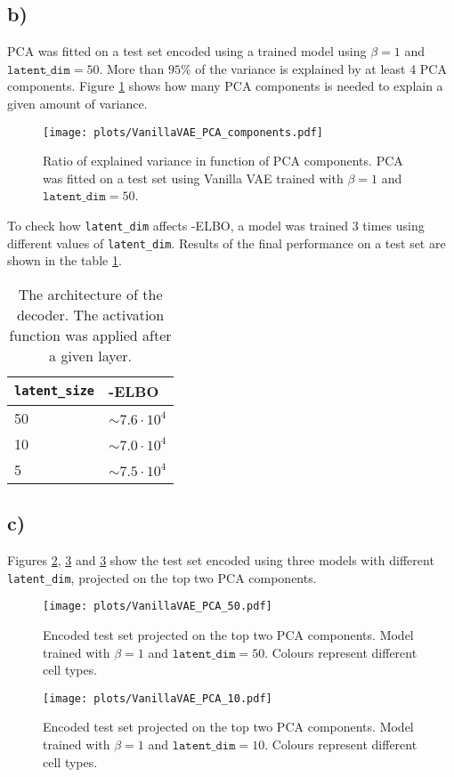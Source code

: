 \documentclass[a4paper,11pt]{article}
\begin{document}
\subsection*{b)}
PCA was fitted on a test set encoded using a trained model using $\beta=1$ and $\texttt{latent\_dim}=50$.
More than $95\%$ of the variance is explained by at least 4 PCA components. Figure \ref{PCA1} shows how many PCA components is needed to explain a given amount of variance.
\begin{figure}[H]
    \centering
    \texttt{[image: plots/VanillaVAE\_PCA\_components.pdf]}
    \caption{Ratio of explained variance in function of PCA components. PCA was fitted on a test set using Vanilla VAE trained with $\beta = 1$ and $\texttt{latent\_dim}=50$.}
    \label{PCA1}
\end{figure}
\noindent To check how \texttt{latent\_dim} affects -ELBO, a model was trained 3 times using different values of \texttt{latent\_dim}. Results of the final performance on a test set are shown in the table \ref{PCATab}.
\begin{table}[H]
\centering
\begin{tabular}{|l|l|}
\hline
 \textbf{\texttt{latent\_size}} & \textbf{-ELBO} \\ \hline
 50 & $\sim7.6\cdot10^{4}$  \\ \hline
 10 & $\sim7.0\cdot10^{4}$  \\ \hline
 5 & $\sim7.5\cdot10^{4}$  \\ \hline
\end{tabular}
\label{PCATab}
\caption{The architecture of the decoder. The activation function was applied after a given layer.}
\end{table}

\subsection*{c)}
Figures \ref{PCA2}, \ref{PCA3} and \ref{PCA3} show the test set encoded using three models with different \texttt{latent\_dim}, projected on the top two PCA components.
\begin{figure}[H]
    \centering
    \texttt{[image: plots/VanillaVAE\_PCA\_50.pdf]}
    \caption{Encoded test set projected on the top two PCA components. Model trained with $\beta=1$ and $\texttt{latent\_dim}=50$. Colours represent different cell types.}
    \label{PCA2}
\end{figure}

\begin{figure}[H]
    \centering
    \texttt{[image: plots/VanillaVAE\_PCA\_10.pdf]}
    \caption{Encoded test set projected on the top two PCA components. Model trained with $\beta=1$ and $\texttt{latent\_dim}=10$. Colours represent different cell types. }
    \label{PCA3}
\end{figure}
\end{document}
